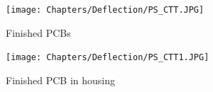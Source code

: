 \begin{figure}[ht]
	\centering
	\begin{subfigure}{0.4\textwidth}
		\centering
		\texttt{[image: Chapters/Deflection/PS\_CTT.JPG]}
		\caption{Finished PCBs }
		\label{fig:ctt_ps}
	\end{subfigure}
	\hspace{0.1\textwidth}
	\begin{subfigure}{0.4\textwidth}
		\centering
		\texttt{[image: Chapters/Deflection/PS\_CTT1.JPG]}
		\caption{Finished PCB in housing}
		\label{fig:ctt_ps_housed}
	\end{subfigure}
	\caption{}
	\label{fig:CTT}
\end{figure}



